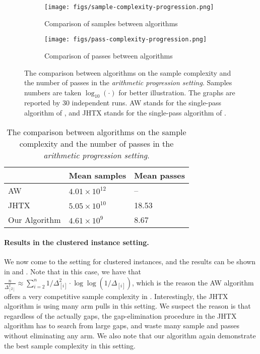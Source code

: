 \begin{figure}
	\centering
	\begin{subfigure}{0.5\textwidth}
		\centering
		\texttt{[image: figs/sample-complexity-progression.png]}
		\caption{Comparison of samples between algorithms}
		\label{fig:progression-exp-sample}
	\end{subfigure}%
	\begin{subfigure}{0.5\textwidth}
		\centering
		\texttt{[image: figs/pass-complexity-progression.png]}
		\caption{Comparison of passes between algorithms}
		\label{fig:progression-exp-pass}
	\end{subfigure}
	\caption{The comparison between algorithms on the sample complexity and the number of passes in the \emph{arithmetic progression setting}. Samples numbers are taken $\log_{10}(\cdot)$ for better illustration. The graphs are reported by $30$ independent runs. AW stands for the single-pass algorithm of \cite{AssadiW20}, and JHTX stands for the single-pass algorithm of \cite{JinH0X21}.}
	\label{fig:experiments-progression}
\end{figure}

\begin{table}[!h]
	\centering
	\captionsetup{justification=centering}
	\caption{\label{tab:exp-progression} The comparison between algorithms on the sample complexity and the number of passes in the \emph{arithmetic progression setting}.}
	\begin{tabular}{|l|l|l|}
		\hline
		& Mean samples & Mean passes \\ \hline
		AW & $4.01\times 10^{12}$ & -- \\ \hline
		JHTX & $5.05\times 10^{10}$ & 18.53 \\ \hline
		Our Algorithm & $4.61\times 10^{9}$ & 8.67  \\ \hline
	\end{tabular}
\end{table}





\paragraph{Results in the clustered instance setting.} We now come to the setting for clustered instances, and the results can be shown in  and . Note that in this case, we have that $\frac{n}{\Delta^2_{[2]}} \approx \sum_{i=2}^{n}1/\Delta^2_{[i]}\cdot \log\log(1/\Delta_{[i]})$, which is the reason the AW algorithm offers a very competitive sample complexity in . Interestingly, the JHTX algorithm is using many arm pulls in this setting. We suspect the reason is that regardless of the actually gaps, the gap-elimination procedure in the JHTX algorithm has to search from large gaps, and waste many sample and passes without eliminating any arm. We also note that our algorithm again demonstrate the best sample complexity in this setting. 


